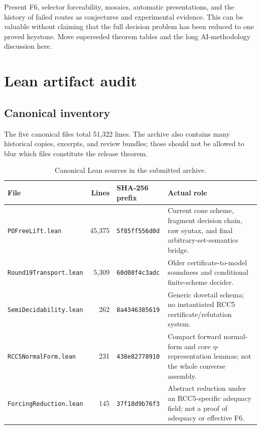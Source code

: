\documentclass[11pt]{article}
\newcommand{\code}[1]{\texttt{#1}}
\begin{document}
\begin{cautionbox}
Present F6, selector forceability, mosaics, automatic presentations, and the
history of failed routes as conjectures and experimental evidence.  This can be
valuable without claiming that the full decision problem has been reduced to
one proved keystone.  Move superseded theorem tables and the long AI-methodology
discussion here.
\end{cautionbox}

\section{Lean artifact audit}

\subsection{Canonical inventory}

The five canonical files total 51,322 lines.  The archive also contains many
historical copies, excerpts, and review bundles; those should not be allowed to
blur which files constitute the release theorem.

\begin{table}[ht]
\centering\small
\begin{tabularx}{\textwidth}{L{0.25\textwidth}rL{0.17\textwidth}Y}
\toprule
File & Lines & SHA-256 prefix & Actual role \\
\midrule
\code{POFreeLift.lean} & 45,375 & \code{5f85ff556d0d} & Current cone scheme,
fragment decision chain, raw syntax, and final arbitrary-set-semantics bridge. \\
\code{Round19Transport.lean} & 5,309 & \code{60d08f4c3adc} & Older
certificate-to-model soundness and conditional finite-scheme decider. \\
\code{SemiDecidability.lean} & 262 & \code{8a4346385619} & Generic dovetail
schema; no instantiated RCC5 certificate/refutation system. \\
\code{RCC5NormalForm.lean} & 231 & \code{438e82778910} & Compact forward
normal-form and core \(\eta\)-representation lemmas; not the whole converse assembly. \\
\code{ForcingReduction.lean} & 145 & \code{37f18d9b76f3} & Abstract reduction
under an RCC5-specific adequacy field; not a proof of adequacy or effective F6. \\
\bottomrule
\end{tabularx}
\caption{Canonical Lean sources in the submitted archive.}
\end{table}
\end{document}
